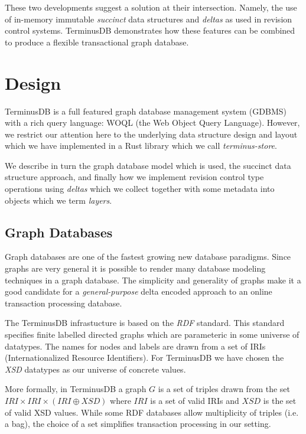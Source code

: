 \documentclass[10pt, a4paper, twocolumn]{article} %
\begin{document}
These two developments suggest a solution at their
intersection. Namely, the use of in-memory immutable {\em succinct}
data structures and {\em deltas} as used in revision control
systems. TerminusDB demonstrates how these features can be combined to
produce a flexible transactional graph database.

\section{Design}

TerminusDB is a full featured graph database management system (GDBMS)
with a rich query language: WOQL (the Web Object Query Language).
However, we restrict our attention here to the underlying data
structure design and layout which we have implemented in a
Rust\cite{Blandy:2015:RPL:3019371} library which we call
{\em{terminus-store}}.

We describe in turn the graph database model which is used, the
succinct data structure approach, and finally how we implement
revision control type operations using {\em deltas} which we collect
together with some metadata into objects which we term {\em layers}.

\subsection{Graph Databases}

Graph databases are one of the fastest growing new database
paradigms. Since graphs are very general it is possible to render many
database modeling techniques in a graph database. The simplicity and
generality of graphs make it a good candidate for a {\em
  general-purpose} delta encoded approach to an online transaction
processing database.

The TerminusDB infrastucture is based on the {\em RDF} standard. This
standard specifies finite labelled directed graphs which are
parameteric in some universe of datatypes. The names for nodes and
labels are drawn from a set of IRIs (Internationalized Resource
Identifiers). For TerminusDB we have chosen the {\em XSD} datatypes as
our universe of concrete values.

More formally, in TerminusDB a graph \(G\) is a set of triples drawn
from the set \( IRI \times IRI \times (IRI \oplus XSD)\) where \(IRI\)
is a set of valid IRIs and \(XSD\) is the set of valid XSD values.
While some RDF databases allow multiplicity of triples (i.e. a bag),
the choice of a set simplifies transaction processing in our setting.
\end{document}
